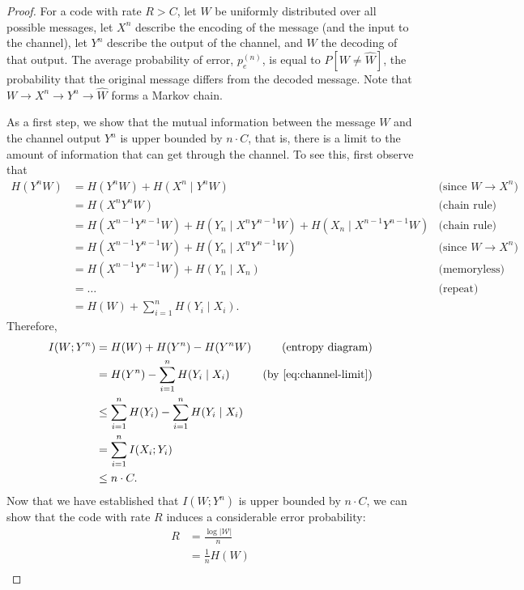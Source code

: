 \begin{proof}
For a code with rate $R > C$, let $W$ be uniformly distributed over all possible messages, let $X^n$ describe the encoding of the message (and the input to the channel), let $Y^n$ describe the output of the channel, and $\hat{W}$ the decoding of that output. The average probability of error, $p_e^{(n)}$, is equal to $P[W \neq \hat{W}]$, the probability that the original message differs from the decoded message. Note that $W \to X^n \to Y^n \to \hat{W}$ forms a Markov chain.

As a first step, we show that the mutual information between the message $W$ and the channel output $Y^n$ is upper bounded by $n\cdot C$, that is, there is a limit to the amount of information that can get through the channel. To see this, first observe that
\begin{align}
H(Y^nW) &= H(Y^nW) + H(X^n \mid Y^nW) &\text{(since }W \to X^n\text{)}\nonumber\\
&= H(X^nY^nW) &\text{(chain rule)}\nonumber\\
&= H(X^{n-1}Y^{n-1}W) + H(Y_n \mid X^nY^{n-1}W) + H(X_n \mid X^{n-1}Y^{n-1}W) &\text{(chain rule)}\nonumber\\
&= H(X^{n-1}Y^{n-1}W) + H(Y_n \mid X^nY^{n-1}W)&\text{(since }W \to X^n\text{)}\nonumber\\
&= H(X^{n-1}Y^{n-1}W) + H(Y_n \mid X_n)&\text{(memoryless)}\nonumber\\
&= \dots &\text{(repeat)}\nonumber\\
&= H(W) + \sum_{i=1}^n H(Y_i \mid X_i).\label{eq:channel-limit}
\end{align}
Therefore,
\begin{align}
I(W;Y^n) &= H(W) + H(Y^n) - H(Y^nW) &\text{(entropy diagram)}\nonumber\\
&= H(Y^n) - \sum_{i=1}^n H(Y_i \mid X_i) &\text{(by \eqref{eq:channel-limit})}\nonumber\\
&\leq \sum_{i=1}^n H(Y_i) - \sum_{i=1}^n H(Y_i \mid X_i)\nonumber\\
&= \sum_{i=1}^n I(X_i;Y_i)\nonumber\\
&\leq n \cdot C.
\end{align}
Now that we have established that $I(W;Y^n)$ is upper bounded by $n \cdot C$, we can show that the code with rate $R$ induces a considerable error probability:
\begin{align}
R &= \frac{\log |\mathcal{W}|}{n}\nonumber\\
&= \frac{1}{n} H(W) \nonumber\\

\end{align}
\end{proof}
